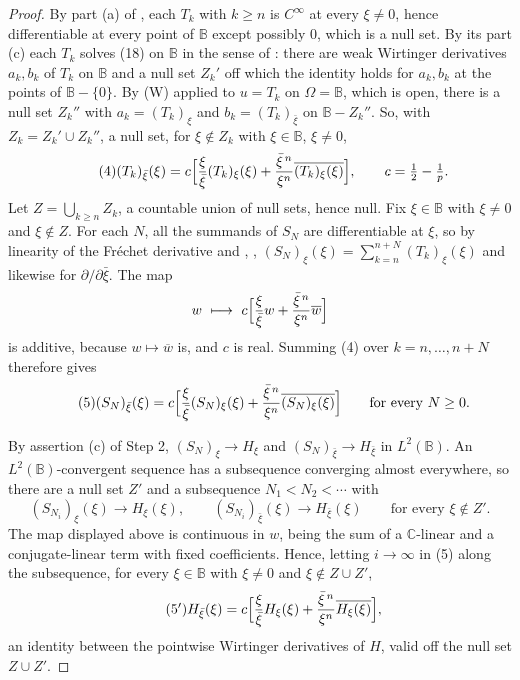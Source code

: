 \begin{proof}
By part (a) of , each $T_k$ with $k\ge n$ is
$C^\infty$ at every $\xi\neq0$, hence differentiable at every point of
$\mathbb{B}$ except possibly $0$, which is a null set.  By its part (c) each
$T_k$ solves (18) on $\mathbb{B}$ in the sense of : there
are weak Wirtinger derivatives $a_k,b_k$ of $T_k$ on $\mathbb{B}$ and a null
set $Z_k'$ off which the identity holds for $a_k,b_k$ at the points of
$\mathbb{B}-\{0\}$.  By (W) applied to $u=T_k$ on $\Omega=\mathbb{B}$, which is open, there is
a null set $Z_k''$ with $a_k=(T_k)_\xi$ and $b_k=(T_k)_{\bar\xi}$ on
$\mathbb{B}-Z_k''$.  So, with $Z_k=Z_k'\cup Z_k''$, a null set, for
$\xi\notin Z_k$ with $\xi\in\mathbb{B}$, $\xi\neq0$,
\begin{equation}\tag{4}
  (T_k)_{\bar\xi}(\xi)=c\Bigl[\frac{\xi}{\bar\xi}(T_k)_\xi(\xi)
    +\frac{\bar\xi^{\,n}}{\xi^{n}}\overline{(T_k)_\xi(\xi)}\Bigr],
  \qquad c=\tfrac12-\tfrac1p .
\end{equation}
Let $Z=\bigcup_{k\ge n}Z_k$, a countable union of null sets, hence null.  Fix
$\xi\in\mathbb{B}$ with $\xi\neq0$ and $\xi\notin Z$.  For each $N$, all the
summands of $S_N$ are differentiable at $\xi$, so by linearity of the Fréchet
derivative and , ,
$(S_N)_\xi(\xi)=\sum_{k=n}^{n+N}(T_k)_\xi(\xi)$ and likewise for
$\partial/\partial\bar\xi$.  The map
\[
  w\ \longmapsto\ c\Bigl[\frac{\xi}{\bar\xi}w
    +\frac{\bar\xi^{\,n}}{\xi^{n}}\overline{w}\Bigr]
\]
is additive, because $w\mapsto\overline{w}$ is, and $c$ is real.  Summing (4)
over $k=n,\dots,n+N$ therefore gives
\begin{equation}\tag{5}
  (S_N)_{\bar\xi}(\xi)=c\Bigl[\frac{\xi}{\bar\xi}(S_N)_\xi(\xi)
    +\frac{\bar\xi^{\,n}}{\xi^{n}}\overline{(S_N)_\xi(\xi)}\Bigr]
  \qquad\text{for every }N\ge0 .
\end{equation}

By assertion (c) of Step 2, $(S_N)_\xi\to H_\xi$ and
$(S_N)_{\bar\xi}\to H_{\bar\xi}$ in $L^2(\mathbb{B})$.  An
$L^2(\mathbb{B})$-convergent sequence has a subsequence converging almost
everywhere, so there are a null set $Z'$ and a subsequence $N_1<N_2<\cdots$
with
\[
  (S_{N_i})_\xi(\xi)\to H_\xi(\xi),\qquad
  (S_{N_i})_{\bar\xi}(\xi)\to H_{\bar\xi}(\xi)
  \qquad\text{for every }\xi\notin Z' .
\]
The map displayed above is continuous in $w$, being the sum of a
$\mathbb{C}$-linear and a conjugate-linear term with fixed coefficients.
Hence, letting $i\to\infty$ in (5) along the subsequence, for every
$\xi\in\mathbb{B}$ with $\xi\neq0$ and $\xi\notin Z\cup Z'$,
\begin{equation}\tag{5$'$}
  H_{\bar\xi}(\xi)=c\Bigl[\frac{\xi}{\bar\xi}H_\xi(\xi)
    +\frac{\bar\xi^{\,n}}{\xi^{n}}\overline{H_\xi(\xi)}\Bigr],
\end{equation}
an identity between the pointwise Wirtinger derivatives of $H$, valid off the
null set $Z\cup Z'$.


\end{proof}

